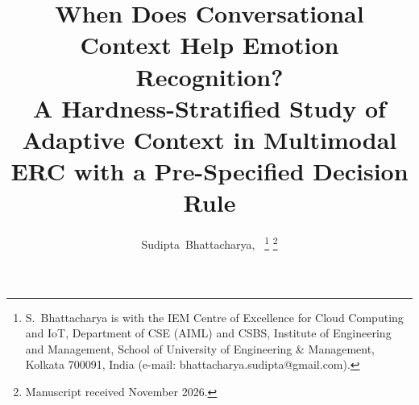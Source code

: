 \documentclass[journal]{IEEEtran}
\begin{document}
\title{When Does Conversational Context Help Emotion Recognition?\\A Hardness-Stratified Study of Adaptive Context in Multimodal ERC with a Pre-Specified Decision Rule}

\author{Sudipta~Bhattacharya,~%
\thanks{S.~Bhattacharya is with the IEM Centre of Excellence for Cloud Computing and IoT, Department of CSE (AIML) and CSBS, Institute of Engineering and Management, School of University of Engineering \& Management, Kolkata 700091, India (e-mail: bhattacharya.sudipta@gmail.com).}%
\thanks{Manuscript received November 2026.}}


\maketitle
\end{document}
